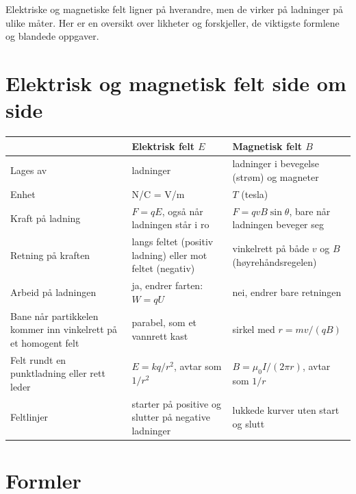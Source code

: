 \documentclass[11pt]{article}
\begin{document}

Elektriske og magnetiske felt ligner på hverandre, men de virker på ladninger på ulike måter. Her er en oversikt over likheter og forskjeller, de viktigste formlene og blandede oppgaver.

\section*{Elektrisk og magnetisk felt side om side}

\begin{center}\small
\begin{tabularx}{\linewidth}{YYY}
\toprule
\textbf{} & \textbf{Elektrisk felt $E$} & \textbf{Magnetisk felt $B$} \\
\midrule
Lages av & ladninger & ladninger i bevegelse (strøm) og magneter \\
Enhet & N/C = V/m & $T$ (tesla) \\
Kraft på ladning & $F = qE$, også når ladningen står i ro & $F = qvB \sin  θ$, bare når ladningen beveger seg \\
Retning på kraften & langs feltet (positiv ladning) eller mot feltet (negativ) & vinkelrett på både $v$ og $B$ (høyrehåndsregelen) \\
Arbeid på ladningen & ja, endrer farten: $W = qU$ & nei, endrer bare retningen \\
Bane når partikkelen kommer inn vinkelrett på et homogent felt & parabel, som et vannrett kast & sirkel med $r = mv/(qB)$ \\
Felt rundt en punktladning eller rett leder & $E = kq/r^{2}$, avtar som $1/r^{2}$ & $B = μ_{0}I/(2πr)$, avtar som $1/r$ \\
Feltlinjer & starter på positive og slutter på negative ladninger & lukkede kurver uten start og slutt \\
\bottomrule
\end{tabularx}
\end{center}

\section*{Formler}
\end{document}
